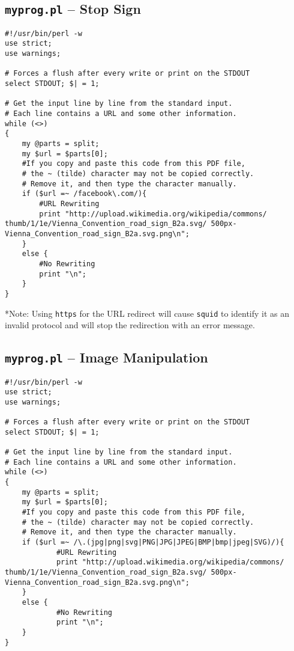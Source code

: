 \documentclass[a4paper,12pt]{article}
\begin{document}
\subsection{\texttt{myprog.pl} -- Stop Sign}
\label{ch:AppBStop}
\begin{verbatim}
#!/usr/bin/perl -w
use strict;
use warnings;

# Forces a flush after every write or print on the STDOUT
select STDOUT; $| = 1;

# Get the input line by line from the standard input.
# Each line contains a URL and some other information.
while (<>)
{
	my @parts = split;
	my $url = $parts[0];
	#If you copy and paste this code from this PDF file,
	# the ~ (tilde) character may not be copied correctly.
	# Remove it, and then type the character manually.
	if ($url =~ /facebook\.com/){
		#URL Rewriting
		print "http://upload.wikimedia.org/wikipedia/commons/ thumb/1/1e/Vienna_Convention_road_sign_B2a.svg/ 500px-Vienna_Convention_road_sign_B2a.svg.png\n";
	}
	else {
		#No Rewriting
		print "\n";
	}
}
\end{verbatim}
*Note: Using \texttt{https} for the URL redirect will cause \texttt{squid} to identify it as an invalid protocol and will stop the redirection with an error message.
\subsection{\texttt{myprog.pl} -- Image Manipulation}
\label{ch:AppBImgMod}
\begin{verbatim}
#!/usr/bin/perl -w
use strict;
use warnings;

# Forces a flush after every write or print on the STDOUT
select STDOUT; $| = 1;

# Get the input line by line from the standard input.
# Each line contains a URL and some other information.
while (<>)
{
    my @parts = split;
    my $url = $parts[0];
    #If you copy and paste this code from this PDF file,
    # the ~ (tilde) character may not be copied correctly.
    # Remove it, and then type the character manually.
    if ($url =~ /\.(jpg|png|svg|PNG|JPG|JPEG|BMP|bmp|jpeg|SVG)/){
            #URL Rewriting
            print "http://upload.wikimedia.org/wikipedia/commons/ thumb/1/1e/Vienna_Convention_road_sign_B2a.svg/ 500px-Vienna_Convention_road_sign_B2a.svg.png\n";
    }
    else {
            #No Rewriting
            print "\n";
    }
}

\end{verbatim}
\end{document}
